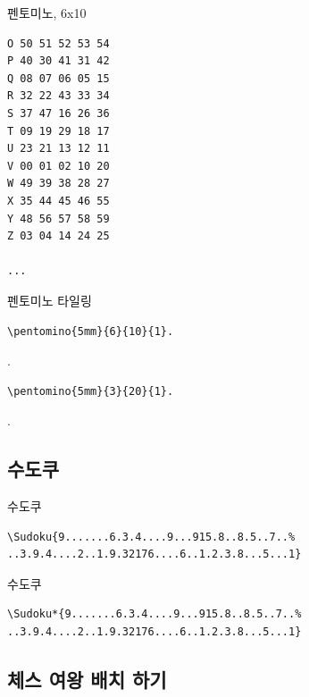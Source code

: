 \documentclass[xcolor=svgnames]{beamer}
\begin{document}
%
\begin{frame}[fragile]{펜토미노, 6x10}
\small
\begin{verbatim}
O 50 51 52 53 54
P 40 30 41 31 42
Q 08 07 06 05 15
R 32 22 43 33 34
S 37 47 16 26 36
T 09 19 29 18 17
U 23 21 13 12 11
V 00 01 02 10 20
W 49 39 38 28 27
X 35 44 45 46 55
Y 48 56 57 58 59
Z 03 04 14 24 25

...
\end{verbatim}
\end{frame}

%
\begin{frame}[fragile]{펜토미노 타일링}
\begin{verbatim}
\pentomino{5mm}{6}{10}{1}.
\end{verbatim}
\vspace{-5mm}
.
\vspace{-5mm}
\begin{verbatim}
\pentomino{5mm}{3}{20}{1}.
\end{verbatim}
\vspace{-5mm}
.
\end{frame}

%
\subsection{수도쿠}

%
\begin{frame}[fragile]{수도쿠}
\begin{verbatim}
\Sudoku{9.......6.3.4....9...915.8..8.5..7..%
..3.9.4....2..1.9.32176....6..1.2.3.8...5...1}
\end{verbatim}  
\begin{center}
\end{center}
\end{frame}

%
\begin{frame}[fragile]{수도쿠}
\begin{verbatim}
\Sudoku*{9.......6.3.4....9...915.8..8.5..7..%
..3.9.4....2..1.9.32176....6..1.2.3.8...5...1}
\end{verbatim}
\begin{center}
\end{center}
\end{frame}

%
\subsection{체스 여왕 배치 하기}
\end{document}
